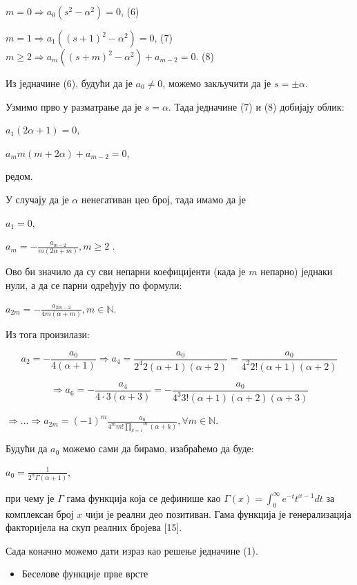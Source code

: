 \(m = 0 \Rightarrow a_{0}(s^{2} - \alpha^{2}) = 0\), (6)

\(m = 1 \Rightarrow a_{1}({(s + 1)}^{2} - \alpha^{2}) = 0\), (7)
\(m \geq 2 \Rightarrow a_{m}({(s + m)}^{2} - \alpha^{2}) + a_{m - 2} = 0\).
(8)

Из једначине (6), будући да је \(a_{0} \neq 0\), можемо закључити да је
\(s = \pm \alpha\).

Узмимо прво у разматрање да је \(s = \alpha\). Тада једначине (7) и (8)
добијају облик:

\(a_{1}(2\alpha + 1) = 0\),

\(a_{m}m(m + 2\alpha) + a_{m - 2} = 0\),

редом.

У случају да је \(\alpha\) ненегативан цео број, тада имамо да је

\(a_{1} = 0\),

\(a_{m} = - \frac{a_{m - 2}}{m(2\alpha + m)},m \geq 2\) .

Ово би значило да су сви непарни коефицијенти (када је \(m\) непарно)
једнаки нули, а да се парни одређују по формули:

\(a_{2m} = - \frac{a_{2m - 2}}{4m(\alpha + m)},m\mathbb{\in N}\).

Из тога произилази:

\[a_{2} = - \frac{a_{0}}{4(\alpha + 1)} \Rightarrow a_{4} = \frac{a_{0}}{2^{4}2(\alpha + 1)(\alpha + 2)} = \frac{a_{0}}{4^{2}2!(\alpha + 1)(\alpha + 2)}\]

\[\Rightarrow a_{6} = - \frac{a_{4}}{4 \cdot 3(\alpha + 3)} = - \frac{a_{0}}{4^{3}3!(\alpha + 1)(\alpha + 2)(\alpha + 3)}\]

\(\Rightarrow ... \Rightarrow a_{2m} = {( - 1)}^{m}\frac{a_{0}}{4^{m}m!\overset{m}{\prod_{k = 1}}(\alpha + k)},\forall m\mathbb{\in N}\).

Будући да \(a_{0}\) можемо сами да бирамо, изабраћемо да буде:

\(a_{0} = \frac{1}{2^{\alpha}\Gamma(\alpha + 1)}\),

при чему је \(\Gamma\) гама функција која се дефинише као
\(\Gamma(x) = \int_{0}^{\infty}e^{- t}t^{x - 1}dt\) за комплексан број
\(x\) чији је реални део позитиван. Гама функција је генерализација
факторијела на скуп реалних бројева {[}15{]}.

Сада коначно можемо дати израз као решење једначине (1).

\begin{itemize}
\item
  Беселове функције прве врсте
\end{itemize}

